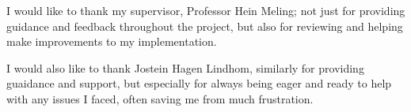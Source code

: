 
\acknowledgements

I would like to thank my supervisor, Professor Hein Meling;
not just for providing guidance and feedback throughout the project, but also for reviewing and helping make improvements to my implementation.

I would also like to thank Jostein Hagen Lindhom, similarly for providing guaidance and support, but especially for always being eager and ready to help with any issues I faced, often saving me from much frustration.